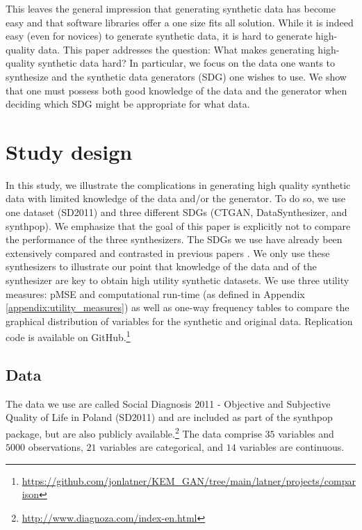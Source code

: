 \documentclass[runningheads]{llncs}
\begin{document}
This leaves the general impression that generating synthetic data has become easy and that software libraries offer a one size fits all solution. While it is indeed easy (even for novices) to generate synthetic data, it is hard to generate high-quality data. This paper addresses the question: What makes generating high-quality synthetic data hard? In particular, we focus on the data one wants to synthesize and the synthetic data generators (SDG) one wishes to use. We show that one must possess both good knowledge of the data and the generator when deciding which SDG might be appropriate for what data. 

\section{Study design}\label{sec:study_design}

In this study, we illustrate the complications in generating high quality synthetic data with limited knowledge of the data and/or the generator.  To do so, we use one dataset (SD2011) and three different SDGs  (CTGAN, DataSynthesizer, and synthpop). We emphasize that the goal of this paper is explicitly not to compare the performance of the three synthesizers. The SDGs we use have already been extensively compared and contrasted in previous papers \cite{dankar2021fake,little2022comparing}. We only use these synthesizers to illustrate our point that knowledge of the data and of the synthesizer are key to obtain high utility synthetic datasets.  We use three utility measures: pMSE and computational run-time (as defined in Appendix \ref{appendix:utility_measures}) as well as one-way frequency tables to compare the graphical distribution of variables for the synthetic and original data.  Replication code is available on GitHub.\footnote{\url{https://github.com/jonlatner/KEM_GAN/tree/main/latner/projects/comparison}}

\subsection{Data}

The data we use are called Social Diagnosis 2011 - Objective and Subjective Quality of Life in Poland (SD2011) and are included as part of the synthpop package, but are also publicly available.\footnote{ \url{http://www.diagnoza.com/index-en.html}}  The data comprise $35$ variables and $5000$ observations, $21$ variables are categorical, and $14$ variables are continuous.
\end{document}
